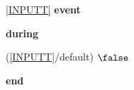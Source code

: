 \noindent \ref{INPUTT}  \textbf{event}
\begin{block}
  \item   \textbf{during}
  \begin{block}
  \item[ (\ref{INPUTT}/default) ]{$\false $} %
  \end{block}
  \item   \textbf{end} \\
\end{block}
